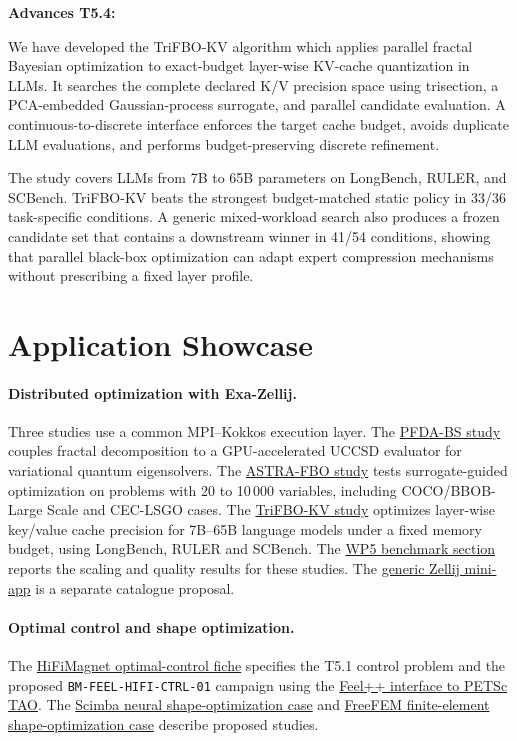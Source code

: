 {\bf Advances T5.4:}

We have developed the TriFBO-KV algorithm which applies parallel fractal Bayesian optimization to exact-budget layer-wise KV-cache quantization in LLMs. It searches the complete declared K/V precision space using
trisection, a PCA-embedded Gaussian-process surrogate, and parallel candidate evaluation. A continuous-to-discrete interface enforces the target cache budget, avoids duplicate LLM evaluations, and performs budget-preserving discrete refinement.

The study covers LLMs from 7B to 65B parameters on LongBench, RULER, and SCBench. TriFBO-KV beats the strongest budget-matched static policy in 33/36 task-specific conditions. A generic mixed-workload search also
produces a frozen candidate set that contains a downstream winner in 41/54 conditions, showing that parallel black-box optimization can adapt expert compression mechanisms without prescribing a fixed layer profile.


\section{Application Showcase}
\label{sec:wp5:applications}

\paragraph{Distributed optimization with Exa-Zellij.}
Three studies use a common MPI--Kokkos execution layer.
The \hyperref[tab:advance:WP5-A2026-1]{PFDA-BS study} couples fractal
decomposition to a GPU-accelerated UCCSD evaluator for variational
quantum eigensolvers. The
\hyperref[tab:advance:WP5-A2026-2]{ASTRA-FBO study} tests surrogate-guided
optimization on problems with 20 to 10\,000 variables, including
COCO/BBOB-Large Scale and CEC-LSGO cases.
The \hyperref[tab:advance:WP5-A2026-3]{TriFBO-KV study} optimizes
layer-wise key/value cache precision for 7B--65B language models
under a fixed memory budget, using LongBench, RULER and SCBench.
The \hyperref[sec:wp5:benchmarks]{WP5 benchmark section} reports the
scaling and quality results for these studies.
The \hyperref[sec:app:specs:app-zellij]{generic Zellij mini-app}
is a separate catalogue proposal.

\paragraph{Optimal control and shape optimization.}
The \hyperref[sec:app:specs:app-feelpp-hifimagnet-optcontrol]{HiFiMagnet
optimal-control fiche} specifies the T5.1 control problem and the
proposed \nolinkurl{BM-FEEL-HIFI-CTRL-01} campaign using the
\hyperref[sec:Feelpp:implementation-2026:tao]{Feel++ interface to PETSc TAO}.
The \hyperref[sec:app:specs:app-scimba-shape-opt-nn]{Scimba neural
shape-optimization case} and
\hyperref[sec:app:specs:app-freefem-shape-opt-fem]{FreeFEM finite-element
shape-optimization case} describe proposed studies.

